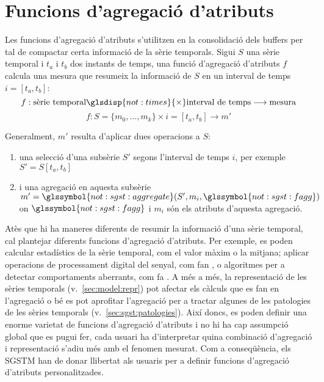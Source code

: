 
\section{Funcions d'agregació d'atributs}
\label{sec:model:interpolador}
\label{sec:model:agregador}


Les funcions d'agregació d'atributs s'utilitzen en la consolidació
dels buffers per tal de compactar certa informació de la sèrie
temporals. Sigui $S$ una sèrie temporal i $t_a$ i $t_b$ dos instants
de temps, una funció d'agregació d'atributs $f$ calcula una mesura que
resumeix la informació de $S$ en un interval de temps $i=[t_a,t_b]$:
\[
f: \text{sèrie temporal} \glsdisp{not:times}{\times}
\text{interval de temps} \longrightarrow \text{mesura}
\]
\[
f: S=\{m_0,\dotsc,m_k\} \times i=[t_a,t_b] \longrightarrow  m'
\]


Generalment, $m'$ resulta d'aplicar dues operacions a $S$: 
\begin{enumerate}
\item una selecció d'una subsèrie $S'$ segons l'interval de temps $i$,
  per exemple $S' = S[t_a,t_b]$
\item i una agregació en aquesta subsèrie $m' =
  \glssymbol{not:sgst:aggregate}(S',m_i,\glssymbol{not:sgst:fagg})$ on
  $\glssymbol{not:sgst:fagg}$ i $m_i$ són els atributs d'aquesta agregació.
\end{enumerate}



Atès que hi ha maneres diferents de resumir la informació d'una sèrie
temporal, cal plantejar diferents funcions d'agregació d'atributs. Per
exemple, es poden calcular estadístics de la sèrie temporal, com el
valor màxim o la mitjana; aplicar operacions de processament digital
del senyal, com fan \textcite{zhang11}, o algoritmes per a detectar
comportaments aberrants, com fa \textcite{lisa00:brutlag}. A més a més, la representació de les sèries temporals
(v.~\autoref{sec:model:repr}) pot afectar els càlculs que es fan en
l'agregació o bé es pot aprofitar l'agregació per a tractar algunes de
les patologies de les sèries temporals
(v.~\autoref{sec:sgst:patologies}).  Així doncs, es poden definir una
enorme varietat de funcions d'agregació d'atributs i no hi ha cap
assumpció global que es pugui fer, cada usuari ha d'interpretar quina
combinació d'agregació i representació s'adiu més amb el fenomen
mesurat. Com a conseqüència, els \gls{SGSTM} han de donar llibertat
als usuaris per a definir funcions d'agregació d'atributs
personalitzades.


